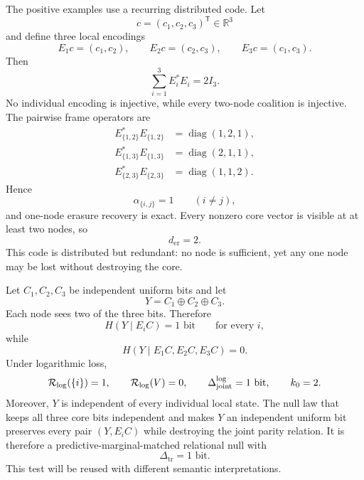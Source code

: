 
The positive examples use a recurring distributed code. Let
\[
c=(c_1,c_2,c_3)^{\mathsf T}\in\mathbb R^3
\]
and define three local encodings
\[
E_1c=(c_1,c_2),
\qquad
E_2c=(c_2,c_3),
\qquad
E_3c=(c_1,c_3).
\]
Then
\[
\sum_{i=1}^3E_i^*E_i=2I_3.
\]
No individual encoding is injective, while every two-node coalition is
injective. The pairwise frame operators are
\[
\begin{aligned}
E_{\{1,2\}}^*E_{\{1,2\}}&=\operatorname{diag}(1,2,1),\\
E_{\{1,3\}}^*E_{\{1,3\}}&=\operatorname{diag}(2,1,1),\\
E_{\{2,3\}}^*E_{\{2,3\}}&=\operatorname{diag}(1,1,2).
\end{aligned}
\]
Hence
\[
\alpha_{\{i,j\}}=1
\qquad(i\neq j),
\]
and one-node erasure recovery is exact. Every nonzero core vector is visible
at at least two nodes, so
\[
d_{\mathrm{er}}=2.
\]
This code is distributed but redundant: no node is sufficient, yet any one
node may be lost without destroying the core.


Let \(C_1,C_2,C_3\) be independent uniform bits and let
\[
Y=C_1\oplus C_2\oplus C_3.
\]
Each node sees two of the three bits. Therefore
\[
H(Y\mid E_iC)=1\text{ bit}
\qquad\text{for every }i,
\]
while
\[
H(Y\mid E_1C,E_2C,E_3C)=0.
\]
Under logarithmic loss,
\[
\mathcal R_{\log}(\{i\})=1,
\qquad
\mathcal R_{\log}(V)=0,
\qquad
\Delta_{\mathrm{joint}}^{\log}=1\text{ bit},
\qquad
k_0=2.
\]
Moreover, \(Y\) is independent of every individual local state. The null law
that keeps all three core bits independent and makes \(Y\) an independent
uniform bit preserves every pair \((Y,E_iC)\) while destroying the joint parity
relation. It is therefore a predictive-marginal-matched relational null with
\[
\Delta_{\mathrm{tr}}=1\text{ bit}.
\]
This test will be reused with different semantic interpretations.



